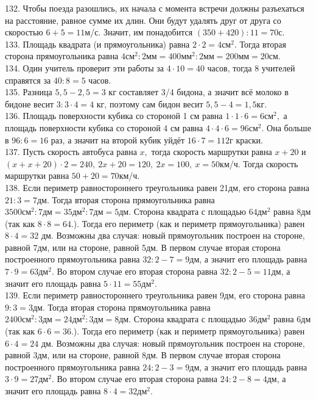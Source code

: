 132. Чтобы поезда разошлись, их начала с момента встречи должны разъехаться на расстояние, равное сумме их длин. Они будут удалять друг от друга со скоростью $6+5=11$м/с. Значит, им понадобится $(350+420):11=70$с.\\
133. Площадь квадрата (и прямоугольника) равна $2\cdot2=4\text{см}^2.$ Тогда вторая сторона прямоугольника равна $4\text{см}^2:2\text{мм}=400\text{мм}^2:2\text{мм}=
200\text{мм}=20$см.\\
134. Один учитель проверит эти работы за $4\cdot10=40$ часов, тогда 8 учителей справятся за $40:8=5$ часов.\\
135. Разница $5,5-2,5=3$ кг составляет 3/4 бидона, а значит всё молоко в бидоне весит $3:3\cdot4=4$ кг, поэтому сам бидон весит $5,5-4=1,5$кг.\\
136. Площадь поверхности кубика со стороной 1 см равна $1\cdot1\cdot6=6\text{см}^2,$ а площадь поверхности кубика со стороной 4 см равна $4\cdot4\cdot6=96\text{см}^2.$ Она больше в $96:6=16$ раз, а значит на второй кубик уйдёт $16\cdot7=112$г краски.\\
137. Пусть скорость автобуса равна $x,$ тогда скорость маршрутки равна $x+20$ и $(x+x+20)\cdot2=240,\ 2x+20=120,\ 2x=100,\ x=50$км/ч. Тогда скорость маршрутки равна $50+20=70$км/ч.\\
138. Если периметр равностороннего треугольника равен 21дм, его сторона равна $21:3=7\text{дм}.$ Тогда вторая сторона прямоугольника равна $3500\text{см}^2:7\text{дм}=35\text{дм}^2:7\text{дм}=5\text{дм}$. Сторона квадрата с площадью $64\text{дм}^2$ равна 8дм (так как $8\cdot8=64.$). Тогда его периметр (как и периметр прямоугольника) равен $8\cdot4=32$ дм. Возможны два случая: новый прямоугольник построен на стороне, равной 7дм, или на стороне, равной 5дм. В первом случае вторая сторона построенного прямоугольника равна $32:2-7=9$дм, а значит его площадь равна $7\cdot9=63\text{дм}^2.$ Во втором случае его вторая сторона равна $32:2-5=11$дм, а значит его площадь равна $5\cdot11=55\text{дм}^2.$\\
139. Если периметр равностороннего треугольника равен 9дм, его сторона равна $9:3=3\text{дм}.$ Тогда вторая сторона прямоугольника равна $2400\text{см}^2:3\text{дм}=24\text{дм}^2:3\text{дм}=8\text{дм}$. Сторона квадрата с площадью $36\text{дм}^2$ равна 6дм (так как $6\cdot6=36.$). Тогда его периметр (как и периметр прямоугольника) равен $6\cdot4=24$ дм. Возможны два случая: новый прямоугольник построен на стороне, равной 3дм, или на стороне, равной 8дм. В первом случае вторая сторона построенного прямоугольника равна $24:2-3=9$дм, а значит его площадь равна $3\cdot9=27\text{дм}^2.$ Во втором случае его вторая сторона равна $24:2-8=4$дм, а значит его площадь равна $8\cdot4=32\text{дм}^2.$\\
